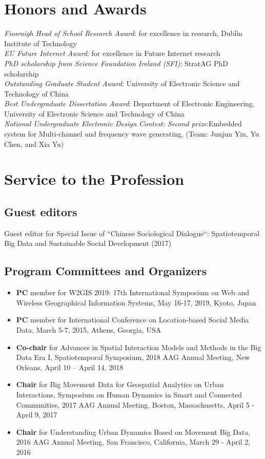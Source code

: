 \documentclass[11pt, a4paper]{article}
\newcommand{\years}[1]{\marginnote{\scriptsize #1}}
\begin{document}
\section*{Honors and Awards}
\noindent
\years{2013}\emph{Fiosraigh Head of School Research Award}: for excellence in research, Dublin Institute of Technology\\
\years{2013}\emph{EU Future Internet Award}: for excellence in Future Internet research\\
\years{2009}\emph{PhD scholarship from Science Foundation Ireland (SFI)}: StratAG PhD scholarship\\
\years{2006}\emph{Outstanding Graduate Student Award}: University of Electronic Science and Technology of China\\
\years{2006}\emph{Best Undergraduate Dissertation Award}: Department of Electronic Engineering, University of Electronic Science and Technology of China\\
\years{2005}\emph{National Undergraduate Electronic Design Contest: Second prize}:Embedded system for Multi-channel and frequency wave generating, (Team: Junjun Yin, Yu Chen, and Xia Yu)

\section*{Service to the Profession}
\subsection*{Guest editors}
Guest editor for Special Issue of ``Chinese Sociological Dialogue``: Spatiotemporal Big Data and Sustainable Social Development (2017)
\subsection*{Program Committees and Organizers}
\begin{itemize}
\item{\textbf{PC} member for W2GIS 2019: 17th International Symposium on Web and Wireless Geographical Information Systems, May 16-17, 2019, Kyoto, Japan}
\item{\textbf{PC} member for International Conference on Location-based Social Media Data, March 5-7, 2015, Athens, Georgia, USA}
\item{\textbf{Co-chair} for Advances in Spatial Interaction Models and Methods in the Big Data Era I, Spatiotemporal Symposium, 2018 AAG Annual Meeting, New Orleans, April 10 – April 14, 2018}
\item{\textbf{Chair} for Big Movement Data for Geospatial Analytics on Urban Interactions, Symposium on Human Dynamics in Smart and Connected Communities, 2017 AAG Annual Meeting, Boston, Massachusetts, April 5 - April 9, 2017}
\item{\textbf{Chair} for Understanding Urban Dynamics Based on Movement Big Data, 2016 AAG Annual Meeting, San Francisco, California, March 29 - April 2, 2016}
\end{itemize}
\end{document}
